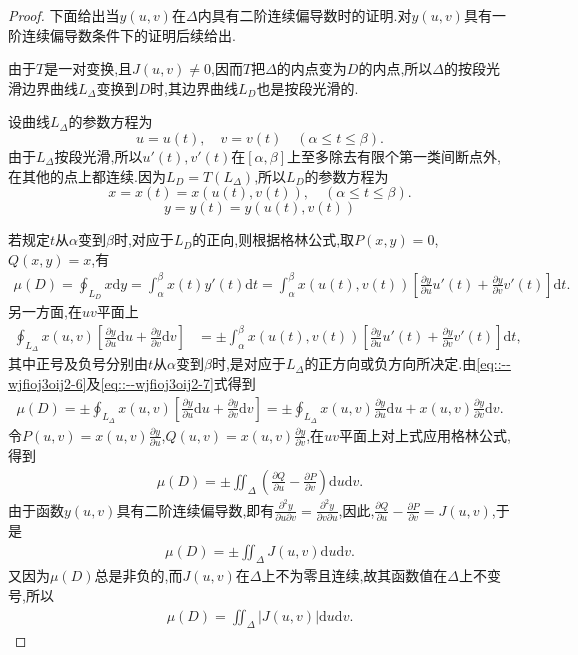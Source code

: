 \documentclass[../../main.tex]{subfiles}%
\begin{document}
\begin{proof}

下面给出当$y(u,v)$在$\Delta$内具有二阶连续偏导数时的证明.对$y(u,v)$具有一阶连续偏导数条件下的证明后续给出.

由于$T$是一对变换,且$J(u,v)\neq0$,因而$T$把$\Delta$的内点变为$D$的内点,所以$\Delta$的按段光滑边界曲线$L_{\Delta}$变换到$D$时,其边界曲线$L_D$也是按段光滑的.

设曲线$L_{\Delta}$的参数方程为
\[
u=u(t),\quad v=v(t)\quad(\alpha\leqslant t\leqslant\beta).
\]
由于$L_{\Delta}$按段光滑,所以$u'(t),v'(t)$在$[\alpha,\beta]$上至多除去有限个第一类间断点外,在其他的点上都连续.因为$L_D=T(L_{\Delta})$,所以$L_D$的参数方程为
\[
x=x(t)=x(u(t),v(t)),\quad(\alpha\leqslant t\leqslant\beta).
\]
\[
y=y(t)=y(u(t),v(t))
\]

若规定$t$从$\alpha$变到$\beta$时,对应于$L_D$的正向,则根据格林公式,取$P(x,y)=0$,$Q(x,y)=x$,有
\begin{align}\label{eq::--wjfioj3oij2-6}
\mu(D)=\oint_{L_D}x\mathrm{d}y=\int_{\alpha}^{\beta}x(t)y'(t)\mathrm{d}t=\int_{\alpha}^{\beta}x(u(t),v(t))\left[\frac{\partial y}{\partial u}u'(t)+\frac{\partial y}{\partial v}v'(t)\right]\mathrm{d}t.
\end{align}
另一方面,在$uv$平面上
\begin{align}\label{eq::--wjfioj3oij2-7}
\oint_{L_{\Delta}}x(u,v)\left[\frac{\partial y}{\partial u}\mathrm{d}u+\frac{\partial y}{\partial v}\mathrm{d}v\right]&=\pm\int_{\alpha}^{\beta}x(u(t),v(t))\left[\frac{\partial y}{\partial u}u'(t)+\frac{\partial y}{\partial v}v'(t)\right]\mathrm{d}t,
\end{align}
其中正号及负号分别由$t$从$\alpha$变到$\beta$时,是对应于$L_{\Delta}$的正方向或负方向所决定.由\eqref{eq::--wjfioj3oij2-6}及\eqref{eq::--wjfioj3oij2-7}式得到
\begin{align*}
\mu(D)=\pm\oint_{L_{\Delta}}x(u,v)\left[\frac{\partial y}{\partial u}\mathrm{d}u+\frac{\partial y}{\partial v}\mathrm{d}v\right]=\pm\oint_{L_{\Delta}}x(u,v)\frac{\partial y}{\partial u}\mathrm{d}u+x(u,v)\frac{\partial y}{\partial v}\mathrm{d}v.
\end{align*}
令$P(u,v)=x(u,v)\frac{\partial y}{\partial u}$,$Q(u,v)=x(u,v)\frac{\partial y}{\partial v}$,在$uv$平面上对上式应用格林公式,得到
\begin{align*}
\mu(D)=\pm\iint_{\Delta}\left(\frac{\partial Q}{\partial u}-\frac{\partial P}{\partial v}\right)\mathrm{d}u\mathrm{d}v.
\end{align*}
由于函数$y(u,v)$具有二阶连续偏导数,即有$\frac{\partial^2 y}{\partial u\partial v}=\frac{\partial^2 y}{\partial v\partial u}$,因此,$\frac{\partial Q}{\partial u}-\frac{\partial P}{\partial v}=J(u,v)$,于是
\begin{align*}
\mu(D)=\pm\iint_{\Delta}J(u,v)\mathrm{d}u\mathrm{d}v.
\end{align*}
又因为$\mu(D)$总是非负的,而$J(u,v)$在$\Delta$上不为零且连续,故其函数值在$\Delta$上不变号,所以
\begin{align*}
\mu(D)=\iint_{\Delta}|J(u,v)|\mathrm{d}u\mathrm{d}v.
\end{align*}


\end{proof}
\end{document}
